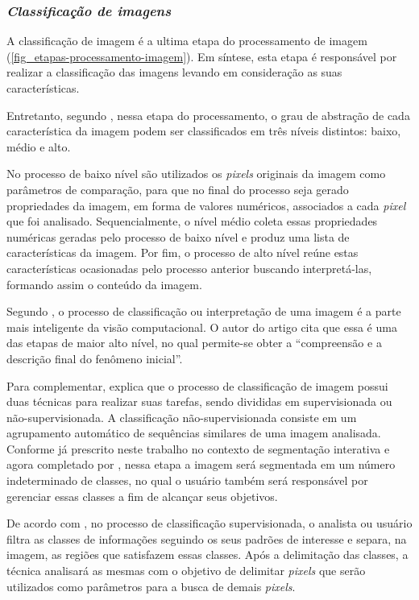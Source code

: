 \subsubsection{\textit{Classificação de imagens}}
\label{classificacao-de-imagem}

A classificação de imagem é a ultima etapa do processamento de imagem (\autoref{fig_etapas-processamento-imagem}). Em síntese, esta etapa é responsável por realizar a classificação das imagens levando em consideração as suas características.

Entretanto, segundo , nessa etapa do processamento, o grau de abstração de cada característica da imagem podem ser classificados em três níveis distintos: baixo, médio e alto.

No processo de baixo nível são utilizados os \textit{pixels} originais da imagem como parâmetros de comparação, para que no final do processo seja gerado propriedades da imagem, em forma de valores numéricos, associados a cada \textit{pixel} que foi analisado. Sequencialmente, o nível médio coleta essas propriedades numéricas geradas pelo processo de baixo nível e produz uma lista de características da imagem. Por fim, o processo de alto nível reúne estas características ocasionadas pelo processo anterior buscando interpretá-las, formando assim o conteúdo da imagem.

Segundo , o processo de classificação ou interpretação de uma imagem é a parte mais inteligente da visão computacional. O autor do artigo cita que essa é uma das etapas de maior alto nível, no qual permite-se obter a “compreensão e a descrição final do fenômeno inicial”.

Para complementar,  explica que o processo de classificação de imagem possui duas técnicas para realizar suas tarefas, sendo divididas em supervisionada ou não-supervisionada. A classificação não-supervisionada consiste em um agrupamento automático de sequências similares de uma imagem analisada. Conforme já prescrito neste trabalho no contexto de segmentação interativa e agora completado por , nessa etapa a imagem será segmentada em um número indeterminado de classes, no qual o usuário também será responsável por gerenciar essas classes a fim de alcançar seus objetivos.

De acordo com , no processo de classificação supervisionada, o analista ou usuário filtra as classes de informações seguindo os seus padrões de interesse e separa, na imagem, as regiões que satisfazem essas classes. Após a delimitação das classes, a técnica analisará as mesmas com o objetivo de delimitar \textit{pixels} que serão utilizados como parâmetros para a busca de demais \textit{pixels}.

